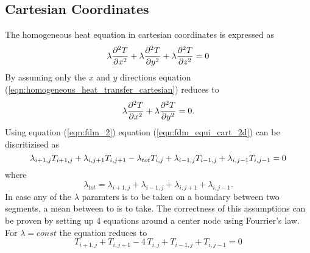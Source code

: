 \subsection{Cartesian Coordinates}
The homogeneous heat equation in cartesian coordinates is expressed as
\begin{equation}
\label{eqn:homogeneous_heat_transfer_cartesian}
    \lambda\pdv[2]{T}{x} + \lambda\pdv[2]{T}{y} + \lambda\pdv[2]{T}{z} = 0
\end{equation}
By assuming only the $x$ and $y$ directions equation (\ref{eqn:homogeneous_heat_transfer_cartesian}) reduces to
\begin{equation}
  \label{eqn:fdm_equi_cart_2d}
  \lambda\pdv[2]{T}{x} + \lambda\pdv[2]{T}{y} = 0.
\end{equation}
Using equation (\ref{eqn:fdm_2}) equation (\ref{eqn:fdm_equi_cart_2d}) can be discritizised as
\begin{equation}
  \lambda_{i+1, j}T_{i + 1, j}  + \lambda_{i, j + 1}T_{i, j + 1} - \\
  \lambda_{tot} T_{i, j} + \\
  \lambda_{i-1, j}T_{i-1, j}  + \lambda_{i, j -1}T_{i, j - 1} = 0
\end{equation}
where
\begin{equation}
  \lambda_{tot} = \lambda_{i+1, j} + \lambda_{i-1, j} + \lambda_{i, j+1} + \lambda_{i, j-1}.
\end{equation}
In case any of the $\lambda$ paramters is to be taken on a boundary between two segments, a mean between to is to take.
The correctness of this assumptions can be proven by setting up 4 equations around a center node using Fourrier's law.
For $\lambda = const$ the equation reduces to
\begin{equation}
  T_{i + 1, j}  + T_{i, j + 1} - 4 \, T_{i, j} + T_{i-1, j}  + T_{i, j - 1} = 0
\end{equation}

